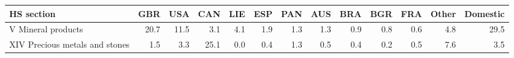 \begin{tabular}{lrrrrrrrrrrrr}
\toprule
HS section & GBR & USA & CAN & LIE & ESP & PAN & AUS & BRA & BGR & FRA & Other & Domestic \\
\midrule
V Mineral products & 20.7 & 11.5 & 3.1 & 4.1 & 1.9 & 1.3 & 1.3 & 0.9 & 0.8 & 0.6 & 4.8 & 29.5 \\
XIV Precious metals and stones & 1.5 & 3.3 & 25.1 & 0.0 & 0.4 & 1.3 & 0.5 & 0.4 & 0.2 & 0.5 & 7.6 & 3.5 \\
\bottomrule
\end{tabular}
